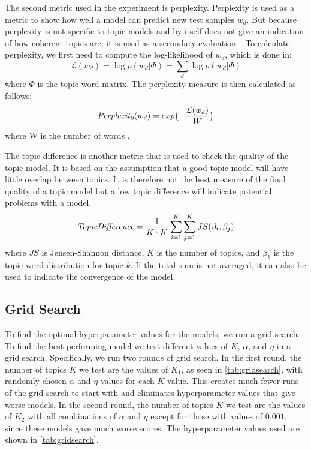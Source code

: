 The second metric used in the experiment is perplexity.
Perplexity is used as a metric to show how well a model can predict new test samples $w_d$.
But because perplexity is not specific to topic models and by itself does not give an indication of how coherent topics are, it is used as a secondary evaluation~\cite{tea_leaves}.
To calculate perplexity, we first need to compute the log-likelihood of $w_d$, which is done in:
\begin{equation}\label{eq:likelihood}
	\mathcal{L}(w_d) = \log p(w_d|\Phi) = \sum_{d} \log p(w_d|\Phi)
\end{equation}
\noindent where $\Phi$ is the topic-word matrix.
The perplexity measure is then calculated as follows:
\begin{equation}
	\emph{Perplexity}(w_d) = exp \{-\frac{\mathcal{L}(w_d)}{W}\}
\end{equation}
\noindent where W is the number of words \cite{de2008evaluating}.

The topic difference is another metric that is used to check the quality of the topic model.
It is based on the assumption that a good topic model will have little overlap between topics.
It is therefore not the best measure of the final quality of a topic model but a low topic difference will indicate potential problems with a model.
\begin{equation}
	\emph{TopicDifference} = \frac{1}{K \cdot K} \sum_{i=1}^{K} \sum_{j=1}^{K} JS(\beta_{i},\beta_{j})
\end{equation}
\noindent where $JS$ is Jensen-Shannon distance, $K$ is the number of topics, and $\beta_{k}$ is the topic-word distribution for topic $k$.
If the total sum is not averaged, it can also be used to indicate the convergence of the model.

\subsection{Grid Search}\label{sec:experiment_gridsearch}
To find the optimal hyperparameter values for the models, we run a grid search.
To find the best performing model we test different values of $K$, $\alpha$, and $\eta$ in a grid search.
Specifically, we run two rounds of grid search.
In the first round, the number of topics $K$ we test are the values of $K_1$, as seen in \autoref{tab:gridsearch}, with randomly chosen $\alpha$ and $\eta$ values for each $K$ value.
This creates much fewer runs of the grid search to start with and eliminates hyperparameter values that give worse models.
In the second round, the number of topics $K$ we test are the values of $K_2$ with all combinations of $\alpha$ and $\eta$ except for those with values of $0.001$, since these models gave much worse scores.
The hyperparameter values used are shown in \autoref{tab:gridsearch}.

